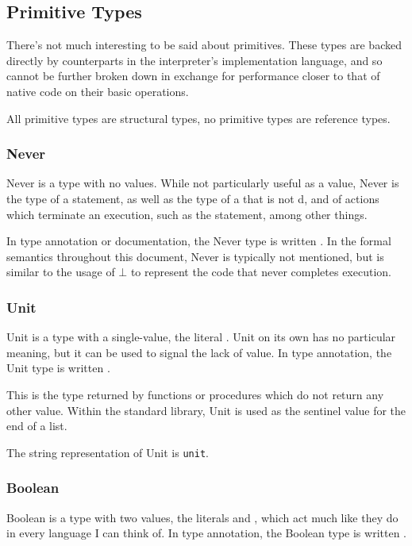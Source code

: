 \subsection{Primitive Types}

There's not much interesting to be said about primitives. These types are
backed directly by counterparts in the interpreter's implementation language,
and so cannot be further broken down in exchange for performance closer to
that of native code on their basic operations.

All primitive types are structural types, no primitive types are reference
types.

\subsubsection{Never}

Never is a type with no values. While not particularly useful as a value,
Never is the type of a  statement, as well as the type of
a  that is not d, and of actions which terminate an
execution, such as the  statement, among other things.

In type annotation or documentation, the Never type is written \ty{!}.
In the formal semantics throughout this document, Never is typically not
mentioned, but is similar to the usage of $\bot$ to represent the code
that never completes execution.

\subsubsection{Unit}

Unit is a type with a single-value, the literal . Unit on its own
has no particular meaning, but it can be used to signal the lack of value.
In type annotation, the Unit type is written .

This is the type returned by functions or procedures which do not return
any other value. Within the standard library, Unit is used as the sentinel
value for the end of a list.

The string representation of Unit is \texttt{unit}.

\subsubsection{Boolean}

Boolean is a type with two values, the literals  and ,
which act much like they do in every language I can think of.
In type annotation, the Boolean type is written .

